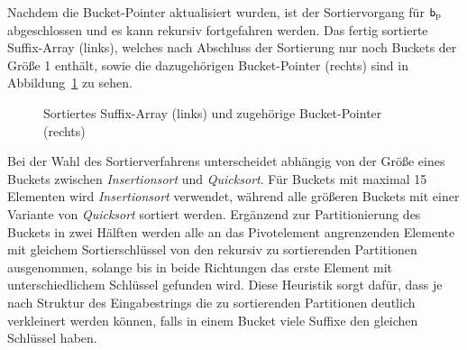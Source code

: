 \noindent Nachdem die Bucket-Pointer aktualisiert wurden, ist der Sortiervorgang für \(\mathsf{b}_{\textup{p}}\) abgeschlossen und es kann rekursiv fortgefahren werden. Das fertig sortierte Suffix-Array (links), welches nach Abschluss der Sortierung nur noch Buckets der Größe 1 enthält, sowie die dazugehörigen Bucket-Pointer (rechts) sind in Abbildung~\ref{fig:buckets_final} zu sehen.\par\smallskip
\begin{figure}[ht]
	\caption[Sortiertes Suffix-Array und zugehörige Bucket-Pointer]{Sortiertes Suffix-Array (links) und zugehörige Bucket-Pointer (rechts)}
	\label{fig:buckets_final}
\end{figure}
Bei der Wahl des Sortierverfahrens unterscheidet \bpr abhängig von der Größe eines Buckets zwischen \emph{Insertionsort} und \emph{Quicksort}. Für Buckets mit maximal 15 Elementen wird \emph{Insertionsort} verwendet, während alle größeren Buckets mit einer Variante von \emph{Quicksort} sortiert werden. Ergänzend zur Partitionierung des Buckets in zwei Hälften werden alle an das Pivotelement angrenzenden Elemente mit gleichem Sortierschlüssel von den rekursiv zu sortierenden Partitionen ausgenommen, solange bis in beide Richtungen das erste Element mit unterschiedlichem Schlüssel gefunden wird. Diese Heuristik sorgt dafür, dass je nach Struktur des Eingabestrings die zu sortierenden Partitionen deutlich verkleinert werden können, falls in einem Bucket viele Suffixe den gleichen Schlüssel haben.\par\smallskip
